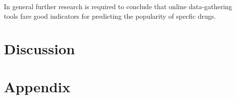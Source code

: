 In general further research is required to conclude that online data-gathering tools fare good indicators for predicting the popularity of specfic drugs.

\section{Discussion}

\section{Appendix}
